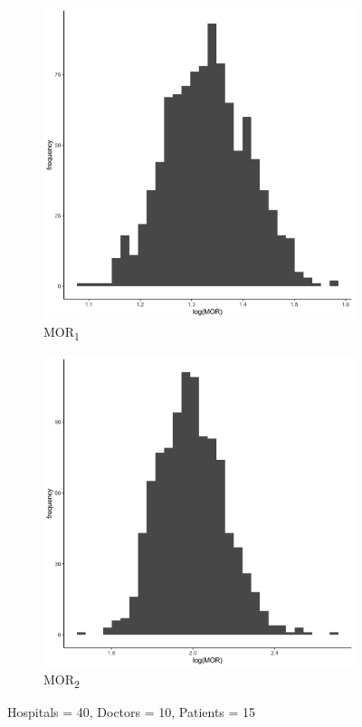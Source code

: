 \documentclass[
  letterpaper,
  DIV=11,
  numbers=noendperiod,
  titlepage]{scrartcl}
\begin{document}
\vspace{10mm}

\begin{figure}
\centering
\begin{subfigure}{.49\textwidth}
    \centering
    \includegraphics[width=.95\linewidth]{../../plots/three-lvl-ran-int/high-prev/hist_40_10_15_three_lvl_high_prev_mor1.png}  
    \caption{MOR\textsubscript{1}}
    \label{l40m10n151}
\end{subfigure}
\begin{subfigure}{.49\textwidth}
    \centering
    \includegraphics[width=.95\linewidth]{../../plots/three-lvl-ran-int/high-prev/hist_40_10_15_three_lvl_high_prev_mor2.png}
    \caption{MOR\textsubscript{2}}
    \label{l40m10n152}
\end{subfigure}
\caption{Hospitals = 40, Doctors = 10, Patients = 15}
\label{mor2}
\end{figure}
\end{document}

